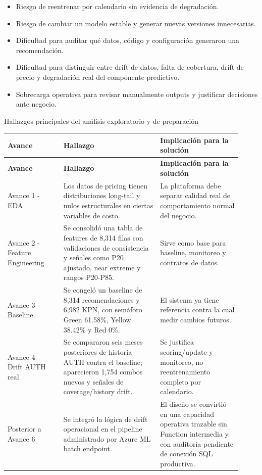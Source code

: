 \documentclass[11pt,letterpaper]{article}
\makeatletter
\renewcommand\section{\@startsection{section}{1}{\z@}
  {-3.5ex \@plus -1ex \@minus -.2ex}
  {2.3ex \@plus .2ex}
  {\Large\bfseries\sffamily\color{azulTec}}}
\makeatother
\begin{document}
\begin{itemize}
  \item Riesgo de reentrenar por calendario sin evidencia de degradación.
  \item Riesgo de cambiar un modelo estable y generar nuevas versiones innecesarias.
  \item Dificultad para auditar qué datos, código y configuración generaron una recomendación.
  \item Dificultad para distinguir entre drift de datos, falta de cobertura, drift de precio y degradación real del componente predictivo.
  \item Sobrecarga operativa para revisar manualmente outputs y justificar decisiones ante negocio.
\end{itemize}

\section{Hallazgos principales del análisis exploratorio y de preparación}

\begin{longtable}{L{0.22\linewidth}L{0.38\linewidth}L{0.32\linewidth}}
\toprule
\textbf{Avance} & \textbf{Hallazgo} & \textbf{Implicación para la solución} \\
\midrule
\endfirsthead
\toprule
\textbf{Avance} & \textbf{Hallazgo} & \textbf{Implicación para la solución} \\
\midrule
\endhead
Avance 1 - EDA & Los datos de pricing tienen distribuciones long-tail y nulos estructurales en ciertas variables de costo. & La plataforma debe separar calidad real de comportamiento normal del negocio. \\
Avance 2 - Feature Engineering & Se consolidó una tabla de features de 8,314 filas con validaciones de consistencia y señales como P20 ajustado, near extreme y rangos P20-P85. & Sirve como base para baseline, monitoreo y contratos de datos. \\
Avance 3 - Baseline & Se congeló un baseline de 8,314 recomendaciones y 6,982 KPN, con semáforo Green 61.58\%, Yellow 38.42\% y Red 0\%. & El sistema ya tiene referencia contra la cual medir cambios futuros. \\
Avance 4 - Drift AUTH real & Se compararon seis meses posteriores de historia AUTH contra el baseline; aparecieron 1,754 combos nuevos y señales de coverage/history drift. & Se justifica scoring/update y monitoreo, no reentrenamiento completo por calendario. \\
Posterior a Avance 6 & Se integró la lógica de drift operacional en el pipeline administrado por Azure ML batch endpoint. & El diseño se convirtió en una capacidad operativa trazable sin Function intermedia y con auditoría pendiente de conexión SQL productiva. \\
\bottomrule
\end{longtable}
\end{document}
